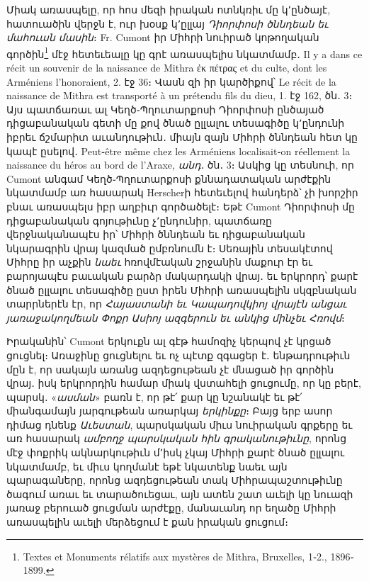 \documentclass{article}
\begin{document}
{Միակ առասպելը, որ հոս մեզի իրական ոտնկռիւ մը կ՚ընծայէ, հատուածին վերջն է, ուր խօսք կ՚ըլլայ \emph{Դիորփոսի ծննդեան եւ մահուան մասին}։ Fr. Cumont իր Միհրի նուիրած կոթողական գործին\footnote{Textes et Monuments rélatifs aux mystères de Mithra, Bruxelles, 1֊2., 1896֊1899.} մէջ հետեւեալը կը գրէ առասպելիս նկատմամբ․ Il y a dans ce récit un souvenir de la naissance de Mithra ἐκ πέτρας et du culte, dont les Arméniens l'honoraient, 2. էջ 36։ Վասն զի իր կարծիքով՝ Le récit de la naissance de Mithra est transporté à un prétendu fils du dieu, 1. էջ 162, ծն․ 3։ Այս պատճառաւ ալ Կեղծ֊Պղուտարքոսի Դիորփոսի ընծայած դիցաբանական գետի մը քով ծնած ըլլալու տեսագիծը կ՚ընդունի իբրեւ ճշմարիտ աւանդութիւն․ միայն զայն Միհրի ծննդեան հետ կը կապէ ըսելով․ Peut֊être même chez les Arméniens localisait֊on réellement la naissance du héros au bord de l'Araxe, \emph{անդ․} ծն․ 3։ Ասկից կը տեսնուի, որ Cumont անգամ Կեղծ֊Պղուտարքոսի քննադատական արժէքին նկատմամբ առ հասարակ Herscherի հետեւելով հանդերձ՝ չի խորշիր բնաւ առասպելս իբր աղբիւր գործածելէ։ Եթէ Cumont Դիորփոսի մը դիցաբանական գոյութիւնը չ՚ընդունիր, պատճառը վերջնականապէս իր՝ Միհրի ծննդեան եւ դիցաբանական նկարագրին վրայ կազմած ըմբռնումն է։ Սեռային տեսակէտով Միհրը իր աչքին \emph{նաեւ} հռովմէական շրջանին մաքուր էր եւ բարոյապէս բաւական բարձր մակարդակի վրայ․ եւ երկրորդ՝ քարէ ծնած ըլլալու տեսագիծը ըստ իրեն Միհրի առասպելին սկզբնական տարրներէն էր, որ \emph{Հայաստանի եւ Կապադովկիոյ վրայէն անցաւ յառաջակողմեան Փոքր Ասիոյ ազգերուն եւ անկից մինչեւ Հռովմ}։

Իրականին՝ Cumont երկուքն ալ գէթ համոզիչ կերպով չէ կրցած ցուցնել։ Առաջինը ցուցնելու եւ ոչ պէտք զգացեր է․ ենթադրութիւն մըն է, որ սակայն առանց ազդեցութեան չէ մնացած իր գործին վրայ․ իսկ երկրորդին համար միակ վստահելի ցուցումը, որ կը բերէ, պարսկ․ «\emph{ասման}» բառն է, որ թէ՛ քար կը նշանակէ եւ թէ՛ միանգամայն յարգութեան առարկայ \emph{երկինքը}։ Բայց երբ ասոր դիմաց դնենք \emph{Աւեստան}, պարսկական միւս նուիրական գրքերը եւ առ հասարակ \emph{ամբողջ պարսկական հին գրականութիւնը}, որոնց մէջ փոքրիկ ակնարկութիւն մ՚իսկ չկայ Միհրի քարէ ծնած ըլլալու նկատմամբ, եւ միւս կողմանէ եթէ նկատենք նաեւ այն պարագաները, որոնց ազդեցութեան տակ Միհրապաշտութիւնը ծագում առաւ եւ տարածուեցաւ, այն ատեն շատ աւելի կը նուազի յառաջ բերուած ցուցման արժէքը, մանաւանդ որ եղածը Միհրի առասպելին աւելի մերձեցում է քան իրական ցուցում։

}
\end{document}

